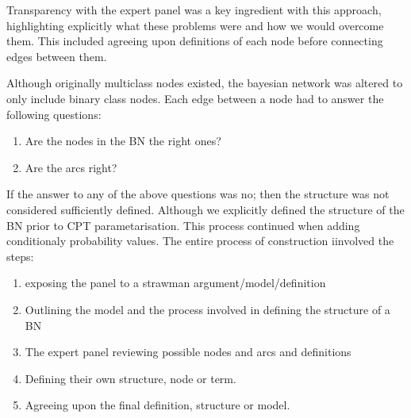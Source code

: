


Transparency with the expert panel was a key ingredient with this approach, highlighting explicitly what these problems were and how we would overcome them. This included agreeing upon definitions of each node before connecting edges between them.

Although originally multiclass nodes existed, the bayesian network was altered to only include binary class nodes. Each edge between a node had to answer the following questions:
\begin{enumerate}
        \item Are the nodes in the BN the right ones?
        \item Are the arcs right?
\end{enumerate}
If the answer to any of the above questions was no; then the structure was not considered sufficiently defined. Although we explicitly defined the structure of the BN prior to CPT parametarisation. This process continued when adding conditionaly probability values. The entire process of construction iinvolved the steps:
\begin{enumerate}
        \item exposing the panel to a strawman argument/model/definition
        \item Outlining the model and the process involved in defining the structure of a BN
        \item The expert panel reviewing possible nodes and arcs and definitions
        \item Defining their own structure, node or term.
        \item Agreeing upon the final definition, structure or model.
\end{enumerate}
